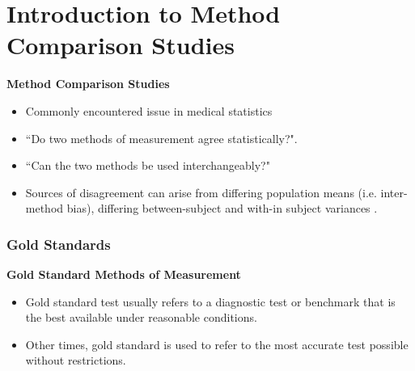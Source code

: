 \documentclass[compress]{beamer}        %
\makeatletter
\newcommand{\tcb}{\textcolor{beamer@blendedblue}}
\makeatother
\begin{document}
\section[Intro to MCS]{Introduction to Method Comparison Studies}
\begin{frame}{\bf \tcb{Method Comparison Studies}}
	\large
\begin{itemize}\itemsep0.7cm
\item Commonly encountered issue in medical statistics
\item ``Do two methods of measurement agree statistically?".
\item ``Can the two methods be used interchangeably?"
\item Sources of disagreement can arise from differing population means (i.e. inter-method bias), differing between-subject and with-in subject variances \cite{Roy2009}.
\end{itemize}
\end{frame}

\begin{frame}
	\frametitle{Gold Standards}
	\large
\textbf{Gold Standard Methods of Measurement}
\begin{itemize}
\item	Gold standard test usually refers to a diagnostic test or benchmark that is the best available under reasonable conditions.
	
\item	Other times, gold standard is used to refer to the most accurate test possible without restrictions.
	
\end{itemize}
\end{frame}
\end{document}

